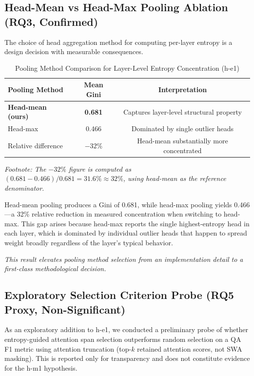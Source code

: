 \subsection{Head-Mean vs Head-Max Pooling Ablation (RQ3, Confirmed)}

The choice of head aggregation method for computing per-layer entropy is a design decision with measurable consequences.

\begin{table}[h]
\centering
\caption{Pooling Method Comparison for Layer-Level Entropy Concentration (h-e1)}
\label{tab:pooling}
\begin{tabular}{lcc}
\toprule
Pooling Method & Mean Gini & Interpretation \\
\midrule
\textbf{Head-mean (ours)} & \textbf{0.681} & Captures layer-level structural property \\
Head-max & 0.466 & Dominated by single outlier heads \\
Relative difference & $-32\%$ & Head-mean substantially more concentrated \\
\bottomrule
\end{tabular}
\end{table}

\noindent\textit{Footnote: The $-32\%$ figure is computed as $(0.681 - 0.466) / 0.681 = 31.6\% \approx 32\%$, using head-mean as the reference denominator.}

Head-mean pooling produces a Gini of 0.681, while head-max pooling yields 0.466---a 32\% relative reduction in measured concentration when switching to head-max. This gap arises because head-max reports the single highest-entropy head in each layer, which is dominated by individual outlier heads that happen to spread weight broadly regardless of the layer's typical behavior.

\textit{This result elevates pooling method selection from an implementation detail to a first-class methodological decision.}

\subsection{Exploratory Selection Criterion Probe (RQ5 Proxy, Non-Significant)}

As an exploratory addition to h-e1, we conducted a preliminary probe of whether entropy-guided attention span selection outperforms random selection on a QA F1 metric using attention truncation (top-$k$ retained attention scores, not SWA masking). This is reported only for transparency and does not constitute evidence for the h-m1 hypothesis.

